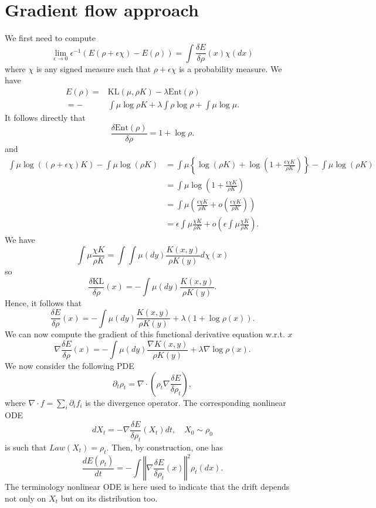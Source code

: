 \documentclass[a4paper]{article}
\begin{document}
\section{Gradient flow approach}
We first need to compute 
\[
\lim_{\epsilon\rightarrow0}\epsilon^{-1}\left(E(\rho+\epsilon\chi)-E(\rho)\right)=\int\frac{\delta E}{\delta\rho}\left(x\right)\chi\left(dx\right)
\]
where $\chi$ is any signed measure such that $\rho+\epsilon\chi$ is a probability measure. We have
\begin{align*}
E(\rho)= & \text{{KL}}(\mu,\rho K)-\lambda\text{{Ent}}(\rho)\\
=- & \int\mu\log\rho K+\lambda\int\rho\log\rho+\int\mu\log\mu.
\end{align*}
It follows directly that 
\[
\frac{\delta\text{{Ent}}\left(\rho\right)}{\delta\rho}=1+\log\rho.
\]
and 
\begin{align*}
\int\mu\log\left(\left(\rho+\epsilon\chi\right)K\right)-\int\mu\log\left(\rho K\right) & =\int\mu\left\{ \log\left(\rho K\right)+\log\left(1+\frac{\epsilon\chi K}{\rho K}\right)\right\} -\int\mu\log\left(\rho K\right)\\
 & =\int\mu\log\left(1+\frac{\epsilon\chi K}{\rho K}\right)\\
 & =\int\mu\left(\frac{\epsilon\chi K}{\rho K}+o\left(\frac{\epsilon\chi K}{\rho K}\right)\right)\\
 & =\epsilon\int\mu\frac{\chi K}{\rho K}+o\left(\epsilon\int\mu\frac{\chi K}{\rho K}\right).
\end{align*}
We have 
\[
\int\mu\frac{\chi K}{\rho K}=\int\int\mu\left(dy\right)\frac{K(x,y)}{\rho K(y)}d\chi\left(x\right)
\]
so 
\[
\frac{\delta \text{KL}}{\delta\rho}\left(x\right)=-\int\mu\left(dy\right)\frac{K(x,y)}{\rho K(y)}.
\]
Hence, it follows that 
\begin{equation}
\label{eq:derivative}
\frac{\delta E}{\delta\rho}\left(x\right)=-\int\mu\left(dy\right)\frac{K(x,y)}{\rho K(y)}+\lambda\left(1+\log\rho\left(x\right)\right).
\end{equation}
We can now compute the gradient of this functional derivative equation w.r.t. $x$
\[
\nabla\frac{\delta E}{\delta\rho}\left(x\right)=-\int\mu\left(dy\right)\frac{\nabla K(x,y)}{\rho K(y)}+\lambda\nabla\log\rho\left(x\right).
\]
We now consider the following PDE
\begin{equation}
\label{eq:pde}
\partial_{t}\rho_{t}=\nabla\cdot\left(\rho_{t}\nabla\frac{\delta E}{\delta\rho_{t}}\right),
\end{equation}
where $\nabla\cdot f=\sum_{i}\partial_{i}f_{i}$ is the divergence operator.
The corresponding nonlinear ODE 
\begin{equation}
dX_{t}=-\nabla\frac{\delta E}{\delta\rho_{t}}\left(X_{t}\right)dt,\quad X_{0}\sim\rho_{0}\label{eq:nonlinearODE}
\end{equation}
is such that $Law(X_{t})=\rho_{t}$.
Then, by construction, one has
\[
\frac{dE\left(\rho_{t}\right)}{dt}=-\int\left\Vert \nabla\frac{\delta E}{\delta\rho_{t}}\left(x\right)\right\Vert ^{2}\rho_{t}\left(dx\right).
\]
The terminology nonlinear ODE is here used to indicate that the drift depends not only on $X_{t}$ but on its distribution too.
\end{document}
